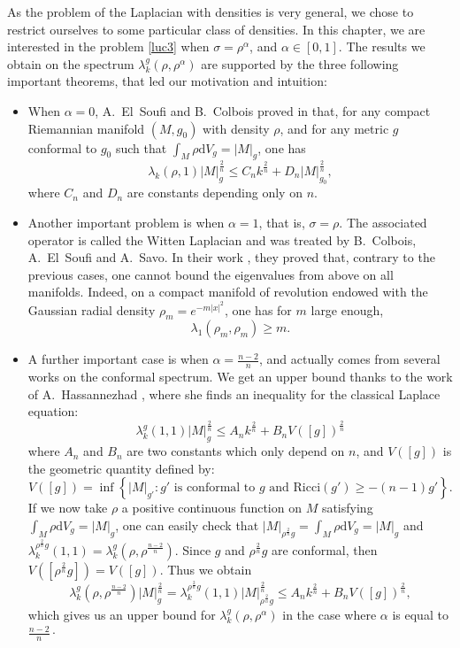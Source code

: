 \documentclass[12pt,reqno]{amsart}		%
\theoremstyle{plain}
\theoremstyle{definition}
\theoremstyle{remark}
\numberwithin{equation}{section}
\renewcommand{\d}{\mathrm{d}}
\begin{document}
As the problem of the Laplacian with densities is very general, we chose to restrict ourselves to some particular class of densities. In this chapter, we are interested in the problem \eqref{luc3} when $\sigma=\rho^{\alpha}$, and $\alpha\in [0,1]$. The results we obtain on the spectrum $\lambda_{k}^g(\rho,\rho^{\alpha})$ are supported by the three following important theorems, that led our motivation and intuition: 
\begin{itemize}
\item
When $\alpha = 0$, A.~El~Soufi and B.~Colbois proved in \cite[Corollary 4.1]{colbois_soufi_2019} that, for any compact Riemannian manifold $(M,g_{0})$ with density $\rho$, and for any metric $g$ conformal to $g_{0}$ such that $\int_{M} \rho \d V_{g}=|M|_{g}$, one has
\[
	\lambda_{k}(\rho,1)|M|_{g}^{\frac{2}{n}}\leqslant C_{n}k^{\frac{2}{n}}+D_{n}|M|_{g_{0}}^{\frac{2}{n}},
\]
where $C_n$ and $D_n$ are constants depending only on $n$.
\item
Another important problem is when $\alpha = 1$, that is, $\sigma=\rho$. The associated operator is called the Witten Laplacian and was treated by B.~Colbois, A.~El~Soufi and A.~Savo. In their work \cite[Theorem 5.2]{colbois_soufi_savo_2015}, they proved that, contrary to the previous cases, one cannot bound the eigenvalues from above on all manifolds. Indeed, on a compact manifold of revolution endowed with the Gaussian radial density $\rho_{m}=e^{-m|x|^{2}}$, one has for $m$ large enough,
\[
\lambda_{1}(\rho_{m},\rho_{m})\geqslant m.
\]
\item A further important case is when $\alpha = \frac{n-2}{n}$, and actually comes from several works on the conformal spectrum. We get an upper bound thanks to the work of A.~Hassannezhad \cite[Theorem 1.1]{hassannezhad_2011}, where she finds an inequality for the classical Laplace equation:
\[
\lambda_{k}^g(1,1)|M|_{g}^{\frac{2}{n}}\leqslant A_{n}k^{\frac{2}{n}}+B_{n}V([g])^{\frac{2}{n}}
\]
where $A_{n}$ and $B_{n}$ are two constants which only depend on $n$, and $V\left([g]\right)$ is the geometric quantity defined by:
\[
V([g])=\inf\left\{|M|_{g'}:g'\mbox{ is conformal to } g \mbox{ and } \text{Ricci}(g')\geqslant-(n-1)g' \right\}.
\]
If we now take $\rho$ a positive continuous function on $M$ satisfying $\int_{M}\rho\d V_g = |M|_g$, one can easily check that $|M|_{\rho^{\frac{2}{n}}g} = \int_{M}\rho\d V_g = |M|_g$ and $\lambda_{k}^{\rho^{\frac{2}{n}}g}(1,1)=\lambda_{k}^{g}(\rho,\rho^{\frac{n-2}{n}})$.
Since $g$ and $\rho^{\frac{2}{n}}g$ are conformal, then $V([\rho^{\frac{2}{n}}g]) = V([g])$.
Thus we obtain
\[
\lambda_{k}^{g}\left(\rho,\rho^{\frac{n-2}{n}}\right)|M|_{g}^{\frac{2}{n}}
=\lambda_{k}^{\rho^{\frac{2}{n}}g}(1,1)|M|_{\rho^{\frac{2}{n}}g}^{\frac{2}{n}}
\leqslant A_{n}k^{\frac{2}{n}}+B_{n}V([g])^{\frac{2}{n}},
\]
which gives us an upper bound for $\lambda_{k}^{g}\left(\rho,\rho^{\alpha}\right)$ in the case where $\alpha$ is equal to $\frac{n-2}{n}\cdot$
\end{itemize}
\end{document}
